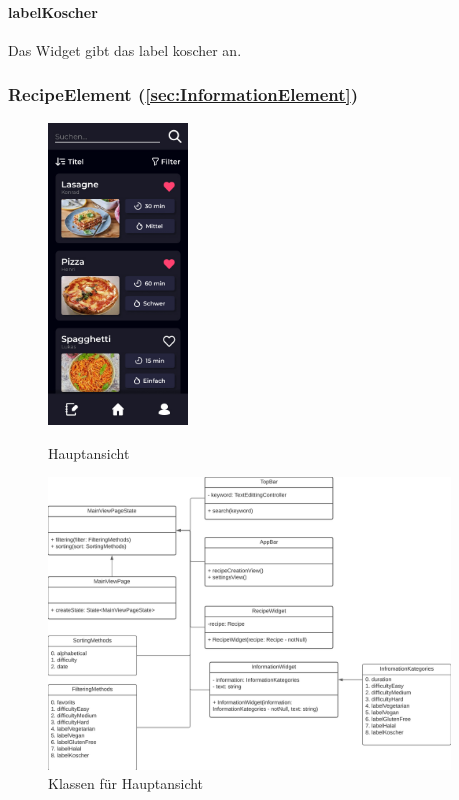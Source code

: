 \documentclass{entwurfsheft}
\begin{document}
\paragraph*{labelKoscher} Das Widget gibt das \gls{label} koscher an.

\subsubsection*{RecipeElement (\ref{sec:InformationElement})}

\begin{figure}[htp]
    \begin{minipage}
        [t]{0.49\textwidth}
        \centering
        \includegraphics[height=80mm]{images/Presentation-layer/MainView.jpg}
        \caption{Hauptansicht}
    \end{minipage}
    \begin{minipage}
        [t]{0.49\textwidth}
        \centering
        \includegraphics[width=0.95\textwidth]{images/Presentation-layer/MainViewClass.png}
        \caption{Klassen für Hauptansicht}
    \end{minipage}
\end{figure}
\end{document}
